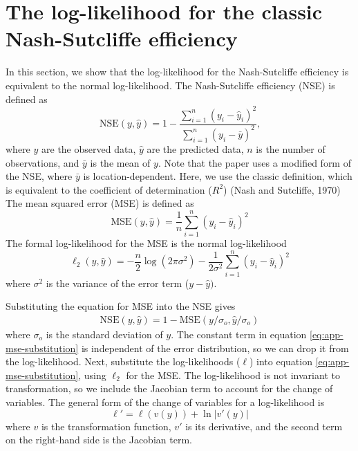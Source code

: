 \documentclass{article}
\begin{document}

\section{The log-likelihood for the classic Nash-Sutcliffe efficiency} %

In this section, we show that the log-likelihood for the Nash-Sutcliffe efficiency
is equivalent to the normal log-likelihood.
The Nash-Sutcliffe efficiency (NSE) is defined as
\begin{equation}
  \text{NSE}(y, \hat{y}) = 1 - \frac{\sum_{i=1}^n (y_i - \hat{y}_i)^2}{\sum_{i=1}^n (y_i - \bar{y})^2} \text{,}
  \label{eq:app-nse}
\end{equation}
where 
$y$ are the observed data,
$\hat{y}$ are the predicted data,
$n$ is the number of observations,
and $\bar{y}$ is the mean of $y$.
Note that the paper uses a modified form of the NSE, where $\bar{y}$ is location-dependent.
Here, we use the classic definition, which is equivalent to the coefficient of determination ($R^2$) (Nash and Sutcliffe, 1970) %
The mean squared error (MSE) is defined as
\begin{equation}
  \text{MSE}(y, \hat{y}) = \frac{1}{n} \sum_{i=1}^n (y_i - \hat{y}_i)^2
  \label{eq:app-mse}
\end{equation}
The formal log-likelihood for the MSE is the normal log-likelihood
\begin{equation}
  \ell_2(y, \hat{y}) = -\frac{n}{2} \log(2 \pi \sigma^2) - \frac{1}{2 \sigma^2} \sum_{i=1}^n (y_i - \hat{y}_i)^2
  \label{eq:app-l2}
\end{equation}
where $\sigma^2$ is the variance of the error term ($y - \hat{y})$.

Substituting the equation for MSE into the NSE gives
\begin{align}
  \text{NSE}(y, \hat{y}) = 1 - \text{MSE}(y / \sigma_o, \hat{y} / \sigma_o)
  \label{eq:app-mse-substitution}
\end{align}
where $\sigma_o$ is the standard deviation of $y$.
The constant term in equation \ref{eq:app-mse-substitution} is independent of the error distribution,
so we can drop it from the log-likelihood.
Next, substitute the log-likelihoods ($\ell$) into equation \ref{eq:app-mse-substitution}, 
using $\ell_2$ for the MSE.
The log-likelihood is not invariant to transformation,
so we include the Jacobian term to account for the change of variables.
The general form of the change of variables for a log-likelihood is
\begin{equation}
  \ell' = \ell(v(y)) + \ln | v'(y) |
\end{equation}
where $v$ is the transformation function, 
$v'$ is its derivative,
and the second term on the right-hand side is the Jacobian term.
\end{document}
